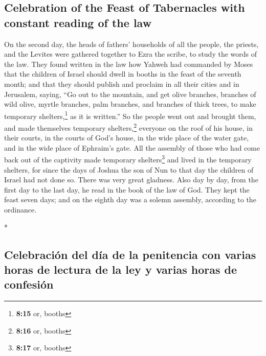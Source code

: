 \begin{paracol}{2}
\begin{otherlanguage}{english}
\hypertarget{celebration-of-the-feast-of-tabernacles-with-constant-reading-of-the-law}{%
\subsection{Celebration of the Feast of Tabernacles with constant
reading of the
law}\label{celebration-of-the-feast-of-tabernacles-with-constant-reading-of-the-law}}

 On the second day, the heads of fathers' households of
all the people, the priests, and the Levites were gathered together to
Ezra the scribe, to study the words of the law.  They
found written in the law how Yahweh had commanded by Moses that the
children of Israel should dwell in booths in the feast of the seventh
month;  and that they should publish and proclaim in all
their cities and in Jerusalem, saying, ``Go out to the mountain, and get
olive branches, branches of wild olive, myrtle branches, palm branches,
and branches of thick trees, to make temporary shelters,\footnote{\textbf{8:15}
  or, booths} as it is written.''  So the people went out
and brought them, and made themselves temporary shelters,\footnote{\textbf{8:16}
  or, booths} everyone on the roof of his house, in their courts, in the
courts of God's house, in the wide place of the water gate, and in the
wide place of Ephraim's gate.  All the assembly of those
who had come back out of the captivity made temporary
shelters\footnote{\textbf{8:17} or, booths} and lived in the temporary
shelters, for since the days of Joshua the son of Nun to that day the
children of Israel had not done so. There was very great gladness.
 Also day by day, from the first day to the last day, he
read in the book of the law of God. They kept the feast seven days; and
on the eighth day was a solemn assembly, according to the ordinance.

\end{otherlanguage}

\switchcolumn[0]*

\hypertarget{celebraciuxf3n-del-duxeda-de-la-penitencia-con-varias-horas-de-lectura-de-la-ley-y-varias-horas-de-confesiuxf3n}{%
\subsection{Celebración del día de la penitencia con varias horas de
lectura de la ley y varias horas de
confesión}\label{celebraciuxf3n-del-duxeda-de-la-penitencia-con-varias-horas-de-lectura-de-la-ley-y-varias-horas-de-confesiuxf3n}}


\end{paracol}
